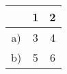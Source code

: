 \documentclass{article}
\begin{document}





\begin{center}
    \large
    \begin{tabular}{ |c| c c| } 
    \hline
          & 1 & 2\\
        \hline
        a)& 3 & 4 \\
        \hline
        b)& 5 & 6 \\
        \hline
    \end{tabular}
\end{center} %
\end{document}
